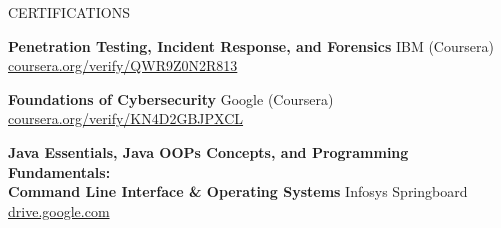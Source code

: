 \documentclass{resume} %
\begin{document}
\begin{rSection}{CERTIFICATIONS}

    \textbf{Penetration Testing, Incident Response, and Forensics} \hfill IBM (Coursera) \\
    \href{https://coursera.org/verify/QWR9Z0N2R813}{coursera.org/verify/QWR9Z0N2R813}

    \vspace{0.1em}
    \textbf{Foundations of Cybersecurity} \hfill Google (Coursera) \\
    \href{https://coursera.org/verify/KN4D2GBJPXCL}{coursera.org/verify/KN4D2GBJPXCL}

    \vspace{0.1em}
    \textbf{Java Essentials, Java OOPs Concepts, and Programming Fundamentals: \\Command Line Interface \& Operating Systems} \hfill Infosys Springboard \\
    \href{https://drive.google.com/drive/folders/1ku7JYTjOOhCaDRoSzWsCSC2EQIBROlZ5?usp=sharing}{drive.google.com}
    
\end{rSection}

\vspace{0.5em}

\end{document}
